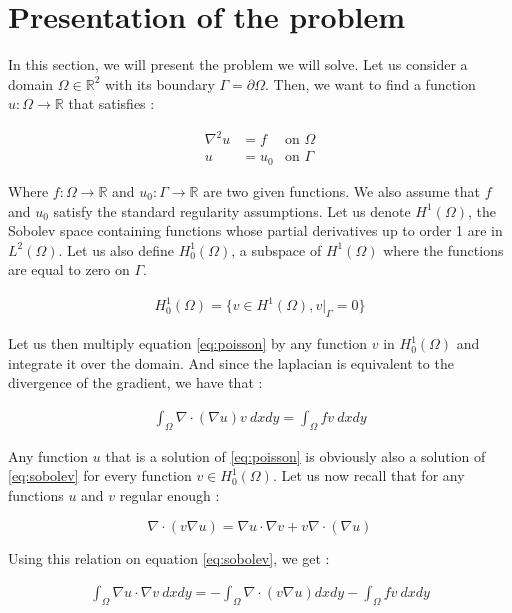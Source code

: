 \section{Presentation of the problem}

In this section, we will present the problem we will solve. Let us consider a domain $\Omega \in \mathbb{R}^2$ with its boundary $\Gamma = \partial\Omega$. Then, we want to find a function $u : \Omega \rightarrow \mathbb{R}$ that satisfies : 

\begin{align}
\nabla^2 u &= f &\text{on $\Omega$} \label{eq:poisson}\\
u &= u_0 &\text{on $\Gamma$}
\end{align}

Where $f : \Omega \rightarrow \mathbb{R}$ and $u_0 : \Gamma \rightarrow \mathbb{R}$ are two given functions. We also assume that $f$ and $u_0$ satisfy the standard regularity assumptions. Let us denote $H^1(\Omega)$, the Sobolev space containing functions whose partial derivatives up to order 1 are in $L^2(\Omega)$. Let us also define $H^1_0(\Omega)$, a subspace of $H^1(\Omega)$ where the functions are equal to zero on $\Gamma$. 

\begin{align*}
H_0^1(\Omega) = \{ v \in H^1(\Omega) , v|_\Gamma = 0 \}
\end{align*}

Let us then multiply equation \ref{eq:poisson} by any function $v$ in $H_0^1(\Omega)$ and  integrate it over the domain. And since the laplacian is equivalent to the divergence of the gradient, we have that : 

\begin{align}
\int_\Omega \nabla \cdot (\nabla u)v \:dxdy = \int_\Omega f v \:dxdy \label{eq:sobolev}
\end{align}

Any function $u$ that is a solution of \ref{eq:poisson} is obviously also a solution of \ref{eq:sobolev} for every function $v \in H_0^1(\Omega)$. Let us now recall that for any functions $u$ and $v$ regular enough : 

$$\nabla \cdot (v\nabla u) = \nabla u \cdot \nabla v + v\nabla \cdot (\nabla u)$$

Using this relation on equation \ref{eq:sobolev}, we get : 

\begin{align}
\int_\Omega \nabla u \cdot \nabla v \:dxdy = -\int_\Omega \nabla \cdot (v\nabla u) dxdy -\int_\Omega f v \:dxdy
\end{align}

